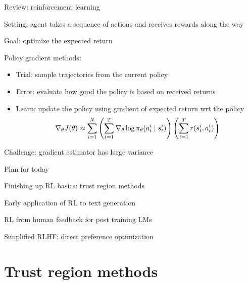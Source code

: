 \documentclass[usenames,dvipsnames,notes,11pt,aspectratio=169,hyperref={colorlinks=true, linkcolor=blue}]{beamer}
\begin{document}
\begin{frame}
    {Review: reinforcement learning}
    \begin{wideitemize}
        \item Setting: agent takes a sequence of actions and receives rewards along the way
        \item Goal: optimize the expected return
        \item Policy gradient methods: 
            \begin{itemize}
                \item Trial: sample trajectories from the current policy
                \item Error: evaluate how good the policy is based on received returns 
                \item Learn: update the policy using gradient of expected return wrt the policy
            $$
            \nabla_\theta J(\theta) \approx \sum_{i=1}^N
            \left( \sum_{t=1}^T \nabla_\theta\log\pi_\theta(a_t^i\mid s_t^i) \right)
            \left( \sum_{t=1}^T r(s_t^i,a_t^i)  \right)
            $$
            \end{itemize}
        \item Challenge: gradient estimator has large variance
    \end{wideitemize}
\end{frame}

\begin{frame}
    {Plan for today}
    \begin{wideitemize}
        \item Finishing up RL basics: trust region methods
        \item Early application of RL to text generation
        \item RL from human feedback for post training LMs
        \item Simplified RLHF: direct preference optimization
    \end{wideitemize}
\end{frame}

\section{Trust region methods}
\end{document}
